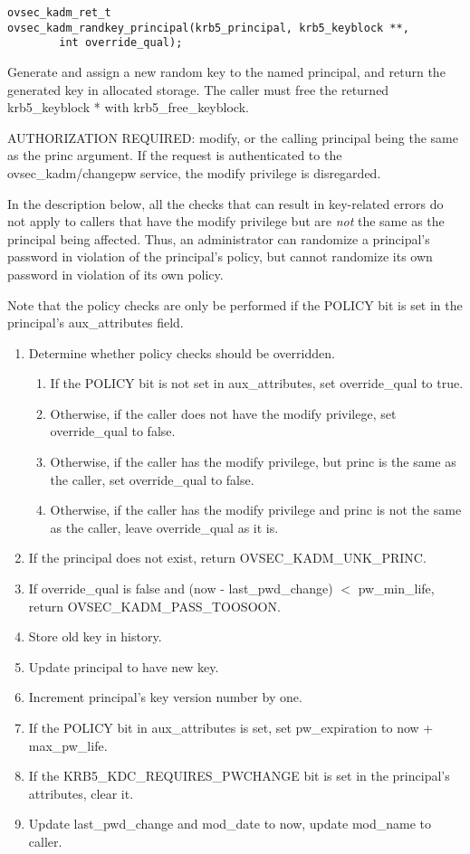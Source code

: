 \begin{verbatim}
ovsec_kadm_ret_t
ovsec_kadm_randkey_principal(krb5_principal, krb5_keyblock **,
		int override_qual);
\end{verbatim}

Generate and assign a new random key to the named principal, and
return the generated key in allocated storage.  The caller must free
the returned krb5_keyblock * with krb5_free_keyblock.

AUTHORIZATION REQUIRED: modify, or the calling principal being the
same as the princ argument.  If the request is authenticated to the
ovsec_kadm/changepw service, the modify privilege is disregarded.

In the description below, all the checks that can result in
key-related errors do not apply to callers that have the modify
privilege but are {\it not} the same as the principal being affected.
Thus, an administrator can randomize a principal's password in
violation of the principal's policy, but cannot randomize its own
password in violation of its own policy.

Note that the policy checks are only be performed if the POLICY bit is
set in the principal's aux_attributes field.

\begin{enumerate}
\item Determine whether policy checks should be overridden.
\begin{enumerate}
\item If the POLICY bit is not set in aux_attributes, set
override_qual to true.
\item Otherwise, if the caller does not have the modify privilege,
set override_qual to false.
\item Otherwise, if the caller has the modify privilege, but princ is the
same as the caller, set override_qual to false.
\item Otherwise, if the caller has the modify privilege and princ is
not the same as the caller, leave override_qual as it is.
\end{enumerate}
\item If the principal does not exist, return OVSEC_KADM_UNK_PRINC.
\item If override_qual is false and (now - last_pwd_change) $<$
pw_min_life, return OVSEC_KADM_PASS_TOOSOON.
\item Store old key in history.
\item Update principal to have new key.
\item Increment principal's key version number by one.
\item If the POLICY bit in aux_attributes is set, set pw_expiration to
now + max_pw_life.
\item If the KRB5_KDC_REQUIRES_PWCHANGE bit is set in the principal's
attributes, clear it.
\item Update last_pwd_change and mod_date to now, update mod_name to
caller.
\end{enumerate}

